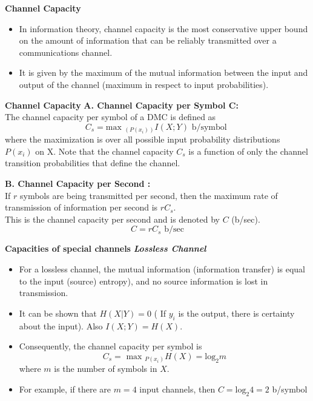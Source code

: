 


\noindent \textbf{Channel Capacity}
\begin{itemize} \item
In information theory, channel capacity is the most conservative upper bound on the amount of information that can be reliably transmitted over a communications channel. \item  It is given by the maximum of the mutual information between the input and output of the channel (maximum in respect to input probabilities).
\end{itemize}



\noindent \textbf{Channel Capacity}
\textbf{A. Channel Capacity per Symbol C:}\\
The channel capacity per symbol of a DMC is defined as
\[
C_s = \mbox{max }_{(P(x_i))}I(X; Y) \mbox{ b/symbol }
\]
where the maximization is over all possible input probability distributions $P(x_i)$ on X. Note that the
channel capacity $C_s$ is a function of only the channel transition probabilities that define the channel.




\textbf{B. Channel Capacity per Second :}\\
If $r$ symbols are being transmitted per second, then the maximum rate of transmission of
information per second is $rC_s$.\\ This is the channel capacity per second and is denoted by $C$ (b/sec).
\[C = rC_s     \mbox{          b/sec} \]






\noindent \textbf{Capacities of special channels}
\textbf{\emph{Lossless Channel}}\\
\begin{itemize} 
\item For a lossless channel, the mutual information (information transfer) is equal to the input (source) entropy), and no source information is lost in transmission.\item It can be shown that $H(X|Y) = 0$ ( If $y_i$ is the output, there is certainty about the input). Also $I(X;Y) = H(X)$.
\item Consequently, the channel capacity per symbol is
\[ C_s = \mbox{ max }_{P(x_i)} H(X) = \mbox{log}_2m \]
where $m$ is the number of symbols in $X$.
\item For example, if there are $m=4$ input channels, then $C =  \mbox{log}_2 4 = 2$ b/symbol  \end{itemize}


